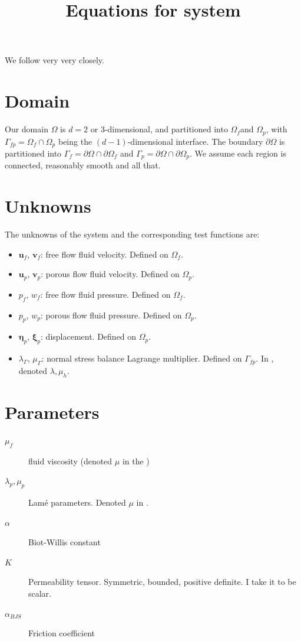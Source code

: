 \documentclass{article}
\newcommand{\stokes}{\ensuremath{\Omega_{f}}}
\newcommand{\stokesbdy}{\ensuremath{\Gamma_{f}}}
\newcommand{\darcy}{\ensuremath{\Omega_{p}}}
\newcommand{\darcybdy}{\ensuremath{\Gamma_{p}}}
\newcommand{\interface}{\ensuremath{\Gamma_{fp}}}
\newcommand{\uf}{\ensuremath{\mathbf{u}_f}}
\newcommand{\vf}{\ensuremath{\mathbf{v}_f}}
\newcommand{\up}{\ensuremath{\mathbf{u}_p}}
\newcommand{\vp}{\ensuremath{\mathbf{v}_p}}
\newcommand{\pf}{\ensuremath{p_f}}
\newcommand{\pp}{\ensuremath{p_p}}
\newcommand{\wf}{\ensuremath{w_f}}
\renewcommand{\wp}{\ensuremath{w_p}}
\newcommand{\disp}{\ensuremath{\boldsymbol{\eta}_p}}
\newcommand{\disptest}{\ensuremath{\boldsymbol{\xi}_p}}
\newcommand{\mult}{\ensuremath{\lambda_{\Gamma}}}
\newcommand{\multtest}{\ensuremath{\mu_{\Gamma}}}
\begin{document}
\title{Equations for system}
\maketitle


We follow \cite{ambartsumyan} very very closely.

\section{Domain}
Our domain $\Omega$ is $d=2 \text{ or } 3$-dimensional, and partitioned into \stokes and \darcy, with $\interface = \stokes \cap \darcy$ being the $(d-1)$-dimensional interface. The boundary $\partial \Omega$ is partitioned into $\stokesbdy = \partial \Omega \cap \partial \stokes$ and $\darcybdy = \partial \Omega \cap \partial \darcy$. We assume each region is connected, reasonably smooth and all that.

\section{Unknowns}
The unknowns of the system and the corresponding test functions are:

\begin{itemize}
\item \uf, \vf : free flow fluid velocity. Defined on \stokes.
\item \up, \vp : porous flow fluid velocity. Defined on \darcy.
\item \pf, \wf : free flow fluid pressure. Defined on \stokes.
\item \pp, \wp : porous flow fluid pressure. Defined on \darcy.
\item \disp, \disptest : displacement. Defined on \darcy.
\item \mult, \multtest : normal stress balance Lagrange multiplier. Defined on \interface. In \cite{ambartsumyan}, denoted $\lambda, \mu_h$.

\end{itemize}

\section{Parameters}

\begin{description}
\item[$\mu_f$] fluid viscosity (denoted $\mu$ in the \cite{ambartsumyan})
  
\item[$\lambda_p, \mu_p$] Lamé parameters. Denoted $\mu$ in \cite{ambartsumyan}.
\item[$\alpha$] Biot-Willis constant
\item[$K$] Permeability tensor. Symmetric, bounded, positive definite. I take it to be scalar.
\item[$\alpha_{BJS}$] Friction coefficient
\end{description}
\end{document}
